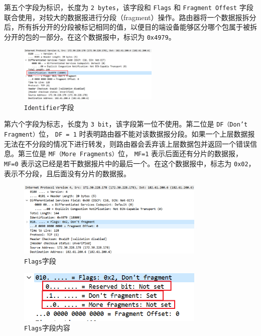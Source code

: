 \documentclass{article}
\begin{document}
第五个字段为标识，长度为 \texttt{2 bytes}，该字段和 \texttt{Flags} 和 \texttt{Fragment Offest} 字段联合使用，对较大的数据报进行分段（fragment）操作。路由器将一个数据报拆分后，所有拆分开的分段被标记相同的值，以便目的端设备能够区分哪个包属于被拆分开的包的一部分。在这个数据报中，标识为 \texttt{0x4979}。

\begin{figure}[H]
  \centering
  \includegraphics[width=0.6\textwidth]{img/13.png}
  \caption{\texttt{Identifier}字段}
  \label{fig:11}
\end{figure}

第六个字段为标志，长度为 \texttt{3 bit}，该字段第一位不使用。第二位是 \texttt{DF（Don’t Fragment）}位， \texttt{DF = 1} 时表明路由器不能对该数据报分段。如果一个上层数据报无法在不分段的情况下进行转发，则路由器会丢弃该上层数据包并返回一个错误信息。第三位是 \texttt{MF（More Fragments）}位， \texttt{MF=1} 表示后面还有分片的数据报， \texttt{MF=0} 表示这已经是若干数据报片中的最后一个。在这个数据报中，标志为 \texttt{0x02}，表示不分段，且后面没有分片的数据报。

\begin{figure}[H]
  \centering
  \includegraphics[width=0.8\textwidth]{img/14.png}
  \caption{\texttt{Flags}字段}
  \label{fig:12}
\end{figure}

\begin{figure}[H]
  \centering
  \includegraphics[width=0.8\textwidth]{img/15.png}
  \caption{\texttt{Flags}字段内容}
  \label{fig:13}
\end{figure}
\end{document}
